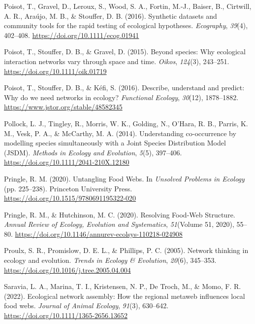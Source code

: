 \documentclass[
]{article}
\newlength{\cslhangindent}
\newenvironment{CSLReferences}[2] %
 {\begin{list}{}{%
  \setlength{\itemindent}{0pt}
  \setlength{\leftmargin}{0pt}
  \setlength{\parsep}{0pt}
  \ifodd #1
   \setlength{\leftmargin}{\cslhangindent}
   \setlength{\itemindent}{-1\cslhangindent}
  \fi
  \setlength{\itemsep}{#2\baselineskip}}}
 {\end{list}}
\begin{document}
\begin{CSLReferences}{1}{0}
Poisot, T., Gravel, D., Leroux, S., Wood, S. A., Fortin, M.-J., Baiser,
B., Cirtwill, A. R., Araújo, M. B., \& Stouffer, D. B. (2016). Synthetic
datasets and community tools for the rapid testing of ecological
hypotheses. \emph{Ecography}, \emph{39}(4), 402--408.
\url{https://doi.org/10.1111/ecog.01941}

Poisot, T., Stouffer, D. B., \& Gravel, D. (2015). Beyond species: Why
ecological interaction networks vary through space and time.
\emph{Oikos}, \emph{124}(3), 243--251.
\url{https://doi.org/10.1111/oik.01719}

Poisot, T., Stouffer, D. B., \& Kéfi, S. (2016). Describe, understand
and predict: Why do we need networks in ecology? \emph{Functional
Ecology}, \emph{30}(12), 1878--1882.
\url{https://www.jstor.org/stable/48582345}

Pollock, L. J., Tingley, R., Morris, W. K., Golding, N., O'Hara, R. B.,
Parris, K. M., Vesk, P. A., \& McCarthy, M. A. (2014). Understanding
co-occurrence by modelling species simultaneously with a {Joint Species
Distribution Model} ({JSDM}). \emph{Methods in Ecology and Evolution},
\emph{5}(5), 397--406. \url{https://doi.org/10.1111/2041-210X.12180}

Pringle, R. M. (2020). Untangling {Food Webs}. In \emph{Unsolved
{Problems} in {Ecology}} (pp. 225--238). Princeton University Press.
\url{https://doi.org/10.1515/9780691195322-020}

Pringle, R. M., \& Hutchinson, M. C. (2020). Resolving {Food-Web
Structure}. \emph{Annual Review of Ecology, Evolution and Systematics},
\emph{51}(Volume 51, 2020), 55--80.
\url{https://doi.org/10.1146/annurev-ecolsys-110218-024908}

Proulx, S. R., Promislow, D. E. L., \& Phillips, P. C. (2005). Network
thinking in ecology and evolution. \emph{Trends in Ecology \&
Evolution}, \emph{20}(6), 345--353.
\url{https://doi.org/10.1016/j.tree.2005.04.004}

Saravia, L. A., Marina, T. I., Kristensen, N. P., De Troch, M., \& Momo,
F. R. (2022). Ecological network assembly: {How} the regional metaweb
influences local food webs. \emph{Journal of Animal Ecology},
\emph{91}(3), 630--642. \url{https://doi.org/10.1111/1365-2656.13652}


\end{CSLReferences}
\end{document}
